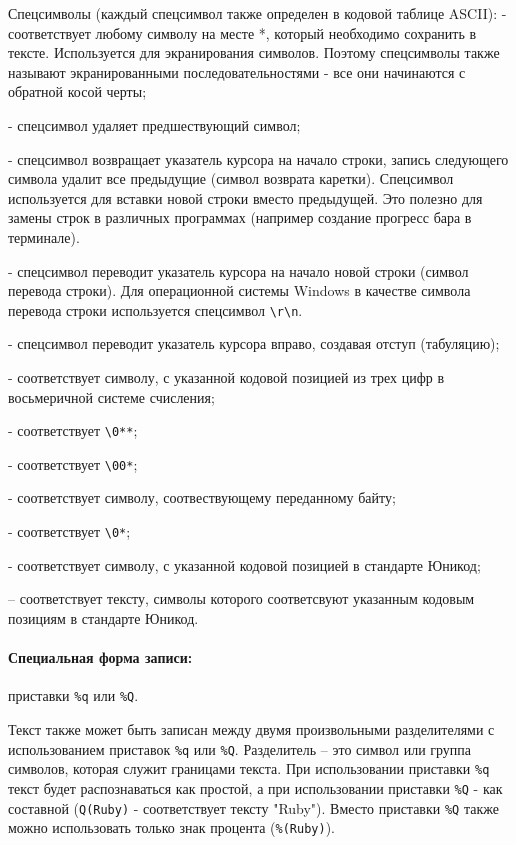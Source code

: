 \begin{keylist}{Спецсимволы (каждый спецсимвол также определен в кодовой таблице ASCII):}  
  \firstkey{\textbackslash *} - соответствует любому символу на месте *, который необходимо сохранить в тексте. Используется для экранирования символов. Поэтому спецсимволы также называют экранированными последовательностями - все они начинаются с обратной косой черты;
  
   -  спецсимвол удаляет предшествующий символ;
  
   - спецсимвол возвращает указатель курсора на начало строки, запись следующего символа удалит все предыдущие (символ возврата каретки). Спецсимвол используется для вставки новой строки вместо предыдущей. Это полезно для замены строк в различных программах (например создание прогресс бара в терминале).
  
   - спецсимвол переводит указатель курсора на начало новой строки (символ перевода строки). Для операционной системы Windows в качестве символа перевода строки используется спецсимвол \verb!\r\n!.
  
   - спецсимвол переводит указатель курсора вправо, создавая отступ (табуляцию);
  
  \key{\textbackslash ***} - соответствует символу, с указанной кодовой позицией из трех цифр в восьмеричной системе счисления;
  
  \key{\textbackslash **} - соответствует \verb!\0**!;
  
  \key{\textbackslash *} - соответствует \verb!\00*!;
  
   - соответствует символу, соотвествующему переданному байту;
  
   - соответствует \verb!\0*!;
  
   - соответствует символу, с указанной кодовой позицией в стандарте Юникод;
  
   – соответствует тексту, символы которого соответсвуют указанным кодовым позициям в стандарте Юникод.
\end{keylist}

\paragraph*{Специальная форма записи:} приставки \verb!%q! или \verb!%Q!.

Текст также может быть записан между двумя произвольными разделителями с использованием приставок \verb!%q! или \verb!%Q!. Разделитель – это символ или группа символов, которая служит границами текста. При использовании приставки \verb!%q! текст будет распознаваться как простой, а при использовании приставки \verb!%Q! - как составной (\verb!Q(Ruby)! - соответствует тексту "Ruby"). Вместо приставки \verb!%Q!  также можно использовать только знак процента (\verb!%(Ruby)!).

